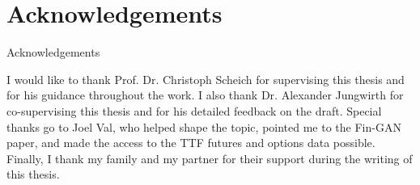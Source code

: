 \section*{Acknowledgements}
%
  {Acknowledgements}

\noindent
I would like to thank Prof. Dr. Christoph Scheich for supervising this thesis and for his guidance throughout the work. I also thank Dr. Alexander Jungwirth for co-supervising this thesis and for his detailed feedback on the draft. Special thanks go to Joel Val, who helped shape the topic, pointed me to the Fin-GAN paper, and made the access to the TTF futures and options data possible. Finally, I thank my family and my partner for their support during the writing of this thesis.